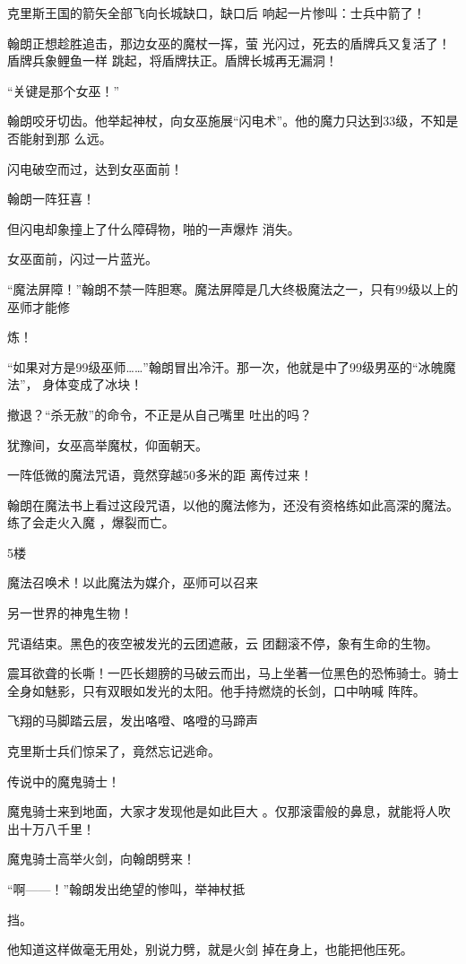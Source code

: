 \documentclass{article}
\begin{document}
克里斯王国的箭矢全部飞向长城缺口，缺口后
响起一片惨叫：士兵中箭了！ 

翰朗正想趁胜追击，那边女巫的魔杖一挥，萤
\newpage
光闪过，死去的盾牌兵又复活了！盾牌兵象鲤鱼一样
跳起，将盾牌扶正。盾牌长城再无漏洞！ 


“关键是那个女巫！” 

翰朗咬牙切齿。他举起神杖，向女巫施展“闪电术”。他的魔力只达到33级，不知是否能射到那
么远。 


闪电破空而过，达到女巫面前！ 


翰朗一阵狂喜！ 

但闪电却象撞上了什么障碍物，啪的一声爆炸
消失。 


女巫面前，闪过一片蓝光。 

“魔法屏障！”翰朗不禁一阵胆寒。魔法屏障是几大终极魔法之一，只有99级以上的巫师才能修

\newpage
炼！ 

“如果对方是99级巫师……”翰朗冒出冷汗。那一次，他就是中了99级男巫的“冰魄魔法”，
身体变成了冰块！ 

撤退？“杀无赦”的命令，不正是从自己嘴里
吐出的吗？ 


犹豫间，女巫高举魔杖，仰面朝天。 

一阵低微的魔法咒语，竟然穿越50多米的距
离传过来！ 

翰朗在魔法书上看过这段咒语，以他的魔法修为，还没有资格练如此高深的魔法。练了会走火入魔
，爆裂而亡。 


5楼 

魔法召唤术！以此魔法为媒介，巫师可以召来

\newpage
另一世界的神鬼生物！ 

咒语结束。黑色的夜空被发光的云团遮蔽，云
团翻滚不停，象有生命的生物。 

震耳欲聋的长嘶！一匹长翅膀的马破云而出，马上坐著一位黑色的恐怖骑士。骑士全身如魅影，只有双眼如发光的太阳。他手持燃烧的长剑，口中呐喊
阵阵。 

飞翔的马脚踏云层，发出咯噔、咯噔的马蹄声


克里斯士兵们惊呆了，竟然忘记逃命。 


传说中的魔鬼骑士！ 

魔鬼骑士来到地面，大家才发现他是如此巨大
。仅那滚雷般的鼻息，就能将人吹出十万八千里！ 


魔鬼骑士高举火剑，向翰朗劈来！ 

“啊——！”翰朗发出绝望的惨叫，举神杖抵
\newpage

挡。 

他知道这样做毫无用处，别说力劈，就是火剑
掉在身上，也能把他压死。 
\end{document}
